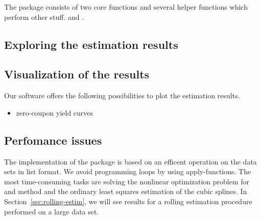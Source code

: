 The package  consists of two core functions and several helper functions which perform other stuff.  and .



\subsection{Exploring the estimation results}
\label{sec:expl-estim-results}



\subsection{Visualization of the results}
\label{sec:visu-results}

Our software offers the following possibilities to plot the estimation results.

\begin{itemize}
\item zero-coupon yield curves
\end{itemize}

\subsection{Perfomance issues}
\label{sec:perfomance-issues}

The implementation of the  package is based on an efficent operation on the data sets in list format. We avoid programming loops by using apply-functions. The most time-consuming tasks are solving the nonlinear optimization problem for \cite{Nelson1987} and \cite{Svensson1994} method and the ordinary least squares estimation of the \cite{McCulloch1975} cubic splines. In Section~\ref{sec:rolling-estim}, we will see results for a rolling estimation procedure performed on a large data set.


